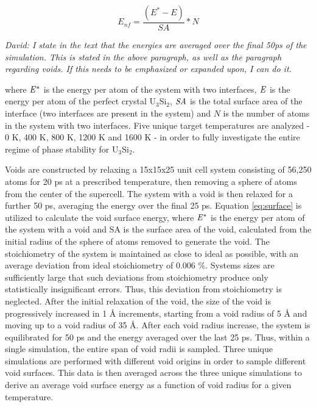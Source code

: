 \documentclass[review]{elsarticle}
\begin{document}
\begin{equation}
\label{eq:surface}
E_{nf}= \frac{(E^{*} - E)}{SA} * N
\end{equation}

\textit{\color{blue}David: I state in the text that the energies are averaged over the final 50ps of the simulation. This is stated in the above paragraph, as well as the paragraph regarding voids. If this needs to be emphasized or expanded upon, I can do it. }

where $\it{E^{*}}$ is the energy per atom of the system with two interfaces, $\it{E}$ is the energy per atom of the perfect crystal U$_{3}$Si$_{2}$, $\it{SA}$ is the total surface area of the interface (two interfaces are present in the system) and $\textit{N}$ is the number of atoms in the system with two interfaces. Five unique target temperatures are analyzed - 0 K, 400 K, 800 K, 1200 K and 1600 K - in order to fully investigate the entire regime of phase stability for U$_{3}$Si$_{2}$. 

Voids are constructed by relaxing a 15x15x25 unit cell system consisting of 56,250 atoms for 20 ps at a prescribed temperature, then removing a sphere of atoms from the center of the supercell. The system with a void is then relaxed for a further 50 ps, averaging the energy over the final 25 ps. Equation \ref{eq:surface} is utilized to calculate the void surface energy, where $\it{E^{*}}$ is the energy per atom of the system with a void and SA is the surface area of the void, calculated from the initial radius of the sphere of atoms removed to generate the void. The stoichiometry of the system is maintained as close to ideal as possible, with an average deviation from ideal stoichiometry of 0.006 {\%}. Systems sizes are sufficiently large that such deviations from stoichiometry produce only statistically insignificant errors. Thus, this deviation from stoichiometry is neglected. After the initial relaxation of the void, the size of the void is progressively increased in 1 {\AA} increments, starting from a void radius of 5 {\AA} and moving up to a void radius of 35 {\AA}. After each void radius increase, the system is equilibrated for 50 ps and the energy averaged over the last 25 ps. Thus, within a single simulation, the entire span of void radii is sampled. Three unique simulations are performed with different void origins in order to sample different void surfaces. This data is then averaged across the three unique simulations to derive an average void surface energy as a function of void radius for a given temperature. 
\end{document}

